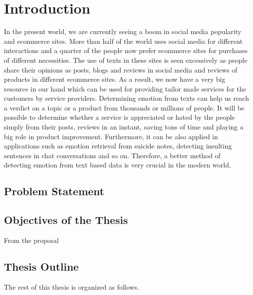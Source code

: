 \chapter{Introduction}\label{intro}

In the present world, we are currently seeing a boom in social media popularity and
ecommerce sites. More than half of the world uses social media for different
interactions and a quarter of the people now prefer ecommerce sites for purchases
of different necessities. The use of texts in these sites is seen excessively as people
share their opinions as posts, blogs and reviews in social media and reviews of
products in different ecommerce sites. As a result, we now have a very big resource
in our hand which can be used for providing tailor made services for the customers
by service providers. Determining emotion from texts can help us reach a verdict
on a topic or a product from thousands or millions of people. It will be possible to
determine whether a service is appreciated or hated by the people simply from their
posts, reviews in an instant, saving tons of time and playing a big role in product
improvement. Furthermore, it can be also applied in applications such as emotion
retrieval from suicide notes, detecting insulting sentences in chat conversations and
so on. Therefore, a better method of detecting emotion from text based data is very
crucial in the modern world.
\section{Problem Statement}



\section{Objectives of the Thesis}
From the proposal

\section{Thesis Outline} 
The rest of this thesis is organized as follows.